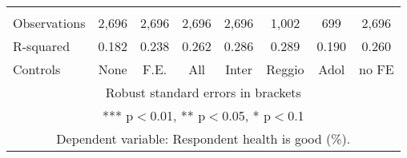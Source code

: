 \begin{tabular}{lccccccc}
 &  &  &  &  &  &  &  \\
Observations & 2,696 & 2,696 & 2,696 & 2,696 & 1,002 & 699 & 2,696 \\
R-squared & 0.182 & 0.238 & 0.262 & 0.286 & 0.289 & 0.190 & 0.260 \\
 Controls & None & F.E. & All & Inter & Reggio & Adol & no FE \\ \hline
\multicolumn{8}{c}{ Robust standard errors in brackets} \\
\multicolumn{8}{c}{ *** p$<$0.01, ** p$<$0.05, * p$<$0.1} \\
\multicolumn{8}{c}{ Dependent variable: Respondent health is good (\%).} \\
\end{tabular}
